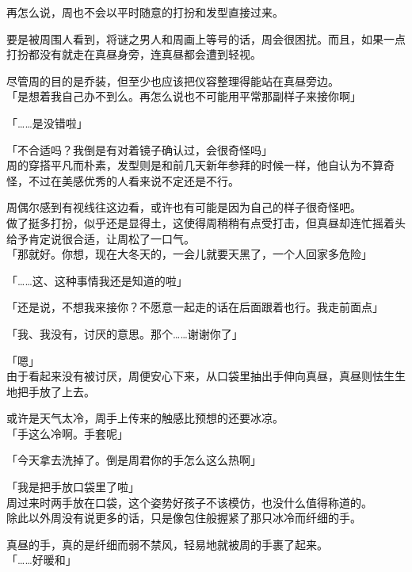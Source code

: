 再怎么说，周也不会以平时随意的打扮和发型直接过来。

要是被周围人看到，将谜之男人和周画上等号的话，周会很困扰。而且，如果一点打扮都没有就走在真昼身旁，连真昼都会遭到轻视。

尽管周的目的是乔装，但至少也应该把仪容整理得能站在真昼旁边。\\

「是想着我自己办不到么。再怎么说也不可能用平常那副样子来接你啊」

「……是没错啦」

「不合适吗？我倒是有对着镜子确认过，会很奇怪吗」\\

周的穿搭平凡而朴素，发型则是和前几天新年参拜的时候一样，他自认为不算奇怪，不过在美感优秀的人看来说不定还是不行。

周偶尔感到有视线往这边看，或许也有可能是因为自己的样子很奇怪吧。\\

做了挺多打扮，似乎还是显得土，这使得周稍稍有点受打击，但真昼却连忙摇着头给予肯定说很合适，让周松了一口气。\\

「那就好。你想，现在大冬天的，一会儿就要天黑了，一个人回家多危险」

「……这、这种事情我还是知道的啦」

「还是说，不想我来接你？不愿意一起走的话在后面跟着也行。我走前面点」

「我、我没有，讨厌的意思。那个……谢谢你了」

「嗯」\\

由于看起来没有被讨厌，周便安心下来，从口袋里抽出手伸向真昼，真昼则怯生生地把手放了上去。

或许是天气太冷，周手上传来的触感比预想的还要冰凉。\\

「手这么冷啊。手套呢」

「今天拿去洗掉了。倒是周君你的手怎么这么热啊」

「我是把手放口袋里了啦」\\

周过来时两手放在口袋，这个姿势好孩子不该模仿，也没什么值得称道的。\\

除此以外周没有说更多的话，只是像包住般握紧了那只冰冷而纤细的手。

真昼的手，真的是纤细而弱不禁风，轻易地就被周的手裹了起来。\\

「……好暖和」\\

